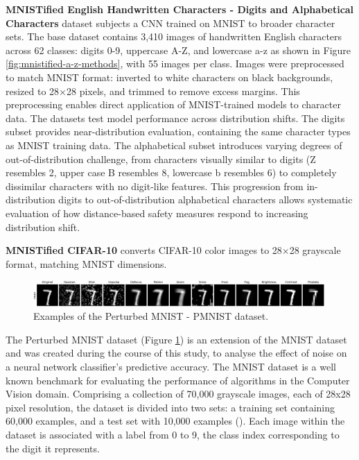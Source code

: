 \textbf{MNISTified English Handwritten Characters - Digits and Alphabetical Characters} dataset \cite{deCampos09} subjects a CNN trained on MNIST to broader character sets. The base dataset contains 3,410 images of handwritten English characters across 62 classes: digits 0-9, uppercase A-Z, and lowercase a-z as shown in Figure \ref{fig:mnistified-a-z-methods}, with 55 images per class.
Images were preprocessed to match MNIST format: inverted to white characters on black backgrounds, resized to 28×28 pixels, and trimmed to remove excess margins. This preprocessing enables direct application of MNIST-trained models to character data.
The datasets test model performance across distribution shifts. The digits subset provides near-distribution evaluation, containing the same character types as MNIST training data. The alphabetical subset introduces varying degrees of out-of-distribution challenge, from characters visually similar to digits (Z resembles 2, upper case B resembles 8, lowercase b resembles 6) to completely dissimilar characters with no digit-like features.
This progression from in-distribution digits to out-of-distribution alphabetical characters allows systematic evaluation of how distance-based safety measures respond to increasing distribution shift.

\textbf{MNISTified CIFAR-10} converts CIFAR-10 color images to 28×28 grayscale format, matching MNIST dimensions.



\begin{figure}[h]
\centering
\includegraphics[width=0.99\textwidth]{Figures/Methods/MNIST_Perturbations.png}
\caption{Examples of the Perturbed MNIST - PMNIST dataset.}
\label{fig:MNIST_Perturbations}
\end{figure}

The Perturbed MNIST dataset (Figure \ref{fig:MNIST_Perturbations}) is an extension of the MNIST dataset and was created during the course of this study, to analyse the effect of noise on a neural network classifier's predictive accuracy. The MNIST dataset is a well known benchmark for evaluating the performance of algorithms in the Computer Vision domain. Comprising a collection of 70,000 grayscale images, each of 28x28 pixel resolution, the dataset is divided into two sets: a training set containing 60,000 examples, and a test set with 10,000 examples (\cite{lecun1998gradient}). Each image within the dataset is associated with a label from 0 to 9, the class index corresponding to the digit it represents.

